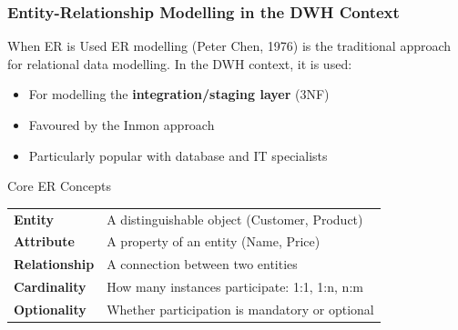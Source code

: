 \begin{frame}
  \frametitle{Entity-Relationship Modelling in the DWH Context}

  \begin{block}{When ER is Used}
    ER modelling (Peter Chen, 1976) is the traditional approach for
    relational data modelling. In the DWH context, it is used:
    \begin{itemize}
      \item For modelling the \textbf{integration/staging layer} (3NF)
      \item Favoured by the Inmon approach
      \item Particularly popular with database and IT specialists
    \end{itemize}
  \end{block}

  \begin{block}{Core ER Concepts}
    \begin{tabularx}{\linewidth}{@{}l X@{}}
      \textbf{Entity}      & A distinguishable object (Customer, Product) \\
      \textbf{Attribute}   & A property of an entity (Name, Price) \\
      \textbf{Relationship}& A connection between two entities \\
      \textbf{Cardinality} & How many instances participate: 1:1, 1:n, n:m \\
      \textbf{Optionality} & Whether participation is mandatory or optional \\
    \end{tabularx}
  \end{block}
\end{frame}

